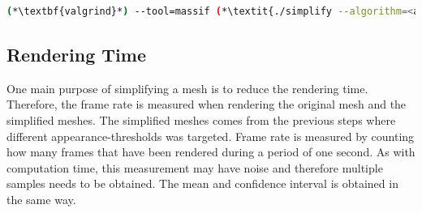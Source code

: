 \begin{lstlisting}[language=bash]
  (*\textbf{valgrind}*) --tool=massif (*\textit{./simplify --algorithm=<algorithm> <input-mesh> <output-mesh>}*)
\end{lstlisting}

\subsection{Rendering Time} \label{sec:rendering_time}
One main purpose of simplifying a mesh is to reduce the rendering time. Therefore, the frame rate is measured when rendering the original mesh and the simplified meshes. The simplified meshes comes from the previous steps where different appearance-thresholds was targeted. Frame rate is measured by counting how many frames that have been rendered during a period of one second. As with computation time, this measurement may have noise and therefore multiple samples needs to be obtained. The mean and confidence interval is obtained in the same way.
\fi


